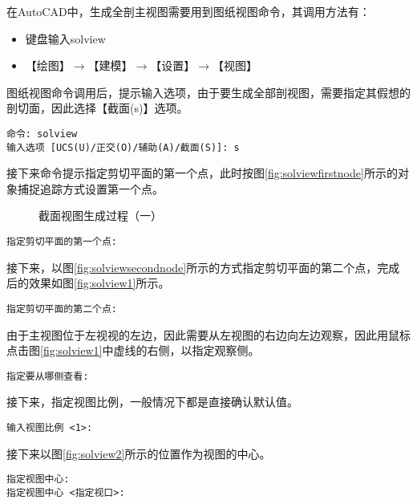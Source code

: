 \begin{procedure}
\begin{enumerate}
在AutoCAD中，生成全剖主视图需要用到图纸视图命令，其调用方法有：
\begin{itemize}
\item 键盘输入solview
\item 【绘图】$\rightarrow $【建模】$\rightarrow $【设置】$\rightarrow $【视图】
\end{itemize}

图纸视图命令调用后，提示输入选项，由于要生成全部剖视图，需要指定其假想的剖切面，因此选择【截面(s)】选项。
\begin{lstlisting}
命令: solview
输入选项 [UCS(U)/正交(O)/辅助(A)/截面(S)]: s
\end{lstlisting}

接下来命令提示指定剪切平面的第一个点，此时按图\ref{fig:solviewfirstnode}所示的对象捕捉追踪方式设置第一个点。

\begin{figure}[htbp]
\centering
{}\hspace{20pt}
\hspace{20pt}
\caption{截面视图生成过程（一）}
\end{figure}

\begin{lstlisting}
指定剪切平面的第一个点:
\end{lstlisting}
接下来，以图\ref{fig:solviewsecondnode}所示的方式指定剪切平面的第二个点，完成后的效果如图\ref{fig:solview1}所示。
\begin{lstlisting}
指定剪切平面的第二个点:
\end{lstlisting}

由于主视图位于左视视的左边，因此需要从左视图的右边向左边观察，因此用鼠标点击图\ref{fig:solview1}中虚线的右侧，以指定观察侧。
\begin{lstlisting}
指定要从哪侧查看:
\end{lstlisting}

接下来，指定视图比例，一般情况下都是直接确认默认值。
\begin{lstlisting}
输入视图比例 <1>:
\end{lstlisting}

接下来以图\ref{fig:solview2}所示的位置作为视图的中心。
\begin{lstlisting}
指定视图中心:
指定视图中心 <指定视口>:
\end{lstlisting}


\end{enumerate}
\end{procedure}

